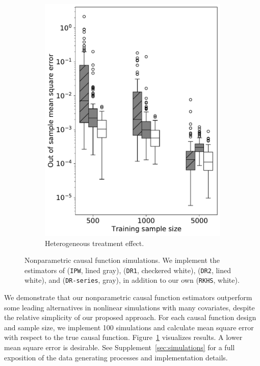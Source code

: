 \begin{figure}[ht]
\begin{centering}
\begin{subfigure}[b]{0.48\textwidth}
         \centering
         \includegraphics[width=\textwidth]{img/CATE_synthetic2_rep100_all_bma.pdf}
         \caption{Heterogeneous treatment effect.}
     \end{subfigure}
\par
\caption{\label{fig:cont}
Nonparametric causal function simulations. We implement the estimators of \cite{abrevaya2015estimating} (\texttt{IPW}, lined gray), \cite{kennedy2017nonparametric} (\texttt{DR1}, checkered white), \cite{colangelo2020double} (\texttt{DR2}, lined white), and \cite{semenova2021debiased} (\texttt{DR-series}, gray), in addition to our own (\texttt{RKHS}, white).}
\end{centering}
\end{figure}
We demonstrate that our nonparametric causal function estimators outperform some leading alternatives in nonlinear simulations with many covariates, despite the relative simplicity of our proposed approach. For each causal function design and sample size, we implement 100 simulations and calculate mean square error with respect to the true causal function. Figure~\ref{fig:cont} visualizes results. A lower mean square error is desirable. See Supplement~\ref{sec:simulations} for a full exposition of the data generating processes and implementation details.  

